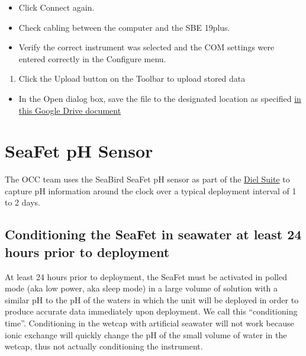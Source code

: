 \documentclass[]{book}
\providecommand{\tightlist}{%
  \setlength{\itemsep}{0pt}\setlength{\parskip}{0pt}}
\begin{document}
\begin{itemize}
\tightlist
\item
  Click Connect again.
\item
  Check cabling between the computer and the SBE 19plus.
\item
  Verify the correct instrument was selected and the COM settings were entered correctly in the Configure menu.
\end{itemize}

\begin{enumerate}
\def\labelenumi{\arabic{enumi}.}
\setcounter{enumi}{4}
\tightlist
\item
  Click the Upload button on the Toolbar to upload stored data
\end{enumerate}

\begin{itemize}
\tightlist
\item
  In the Open dialog box, save the file to the designated location as specified \href{https://drive.google.com/drive/folders/1WcZclgRCLHNOXykYigSZviiwFEH02lKx}{in this Google Drive document}
\end{itemize}

\hypertarget{seafet-ph-sensor}{%
\chapter{SeaFet pH Sensor}\label{seafet-ph-sensor}}

The OCC team uses the SeaBird SeaFet pH sensor as part of the \protect\hyperlink{dielsuite}{Diel Suite} to capture pH information around the clock over a typical deployment interval of 1 to 2 days.

\hypertarget{conditioning-the-seafet-in-seawater-at-least-24-hours-prior-to-deployment}{%
\section{Conditioning the SeaFet in seawater at least 24 hours prior to deployment}\label{conditioning-the-seafet-in-seawater-at-least-24-hours-prior-to-deployment}}

At least 24 hours prior to deployment, the SeaFet must be activated in polled mode (aka low power, aka sleep mode) in a large volume of solution with a similar pH to the pH of the waters in which the unit will be deployed in order to produce accurate data immediately upon deployment. We call this ``conditioning time''. Conditioning in the wetcap with artificial seawater will not work because ionic exchange will quickly change the pH of the small volume of water in the wetcap, thus not actually conditioning the instrument.
\end{document}
